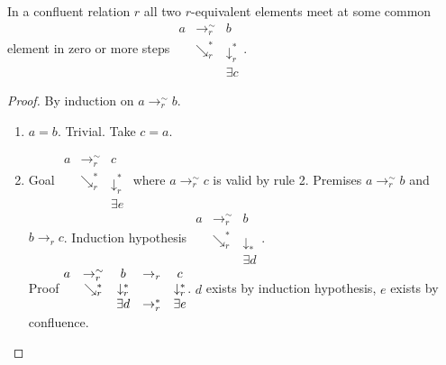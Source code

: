 \begin{theorem} In a confluent relation $r$ all two $r$-equivalent elements
  meet at some common element in zero or more steps
  $
  \begin{matrix}
    a & \to_r^\sim & b \\
    & \searrow_r^* & \downarrow_r^*\\
    & & \exists c
  \end{matrix}
  $.
  \begin{proof}
    By induction on $a \to_r^\sim b$.
    \begin{enumerate}

    \item $a = b$. Trivial. Take $c = a$.

    \item
      Goal
      $\begin{matrix}
        a    & \to_r^\sim      & c                      \\
              & \searrow_r^* & \downarrow_r^*  \\
        & & \exists e
      \end{matrix}$
      where $a \to_r^\sim c$ is valid by rule 2. Premises $a \to_r^\sim b$
      and $b \to_r c$.
      Induction hypothesis
      $\begin{matrix}
        a    & \to_r^\sim      & b                      \\
              & \searrow_r^* & \downarrow_*  \\
        & & \exists d
      \end{matrix}$.\\
      Proof
      $\begin{matrix}
        a & \to^\sim_r & b & \to_r & c\\
        & \searrow_r^* & \downarrow_r^*  & & \downarrow_r^*\\
        & & \exists d & \to_r^* & \exists e
      \end{matrix}$.
      $d$ exists by induction hypothesis, $e$ exists by confluence.


\end{enumerate}
\end{proof}
\end{theorem}
